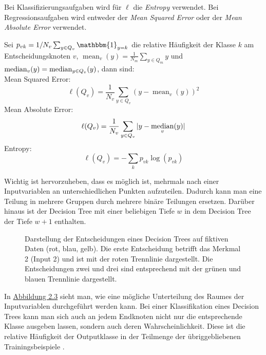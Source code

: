 Bei Klassifizierungsaufgaben wird f\"ur $\ell$ die \textit{Entropy} verwendet. Bei Regressionsaufgaben wird entweder der \textit{Mean Squared Error} oder
der \textit{Mean Absolute Error} verwendet.

Sei $p_{vk} = 1/N_v \sum_{y \in Q_v} \mathbbm{1}_{y = k}$
die relative H\"aufigkeit der Klasse $k$ am Entscheidungsknoten $v$, $\operatorname{mean}_v(y) = \frac{1}{N_m}\sum_{y\in Q_m}y$ und $ \operatorname*{median}_v(y) = \operatorname*{median}_{y \in Q_v}(y)$, dann sind: \\

Mean Squared Error:  $$ \ell(Q_v) = \frac{1}{N_v} \sum_{y\in Q_v} (y - \operatorname{mean}_v(y))^2 $$
Mean Absolute Error: $$ \ell(Q_v) = \frac{1}{N_v} \sum_{y\in Q_v} |y - \operatorname*{median}_v(y)| $$
Entropy: $$ \ell(Q_v) = - \sum_{k} p_{vk}\log(p_{vk}) $$

Wichtig ist hervorzuheben, dass es m\"oglich ist, mehrmals nach einer Inputvariablen an unterschiedlichen Punkten aufzuteilen.
Dadurch kann man eine Teilung in mehrere Gruppen durch mehrere bin\"are Teilungen ersetzen.
Dar\"uber hinaus ist der Decision Tree mit einer beliebigen Tiefe $w$ in dem Decision Tree der Tiefe $w + 1$ enthalten.

\begin{figure}[ht]
	\label{fig:rf2}
	\begin{center}
		\begin{tiny}
		\end{tiny}
	\end{center}
	\caption[Regression eines Random Forest Modells]
	{Darstellung der Entscheidungen eines Decision Trees auf fiktiven Daten (rot, blau, gelb). Die erste Entscheidung
		betrifft das Merkmal 2 (Input 2) und ist mit der roten Trennlinie dargestellt. Die Entscheidungen zwei und drei sind
		entsprechend mit der gr\"unen und blauen Trennlinie dargestellt.}
\end{figure}

In \hyperref[fig:rf2]{Abbildung 2.3} sieht man, wie eine m\"ogliche Unterteilung des
Raumes der Inputvariablen durchgef\"uhrt werden kann. Bei einer Klassifikation eines Decision Trees kann man sich auch an jedem Endknoten nicht nur die entsprechende Klasse
ausgeben lassen, sondern auch deren Wahrscheinlichkeit. Diese ist die relative H\"aufigkeit der Outputklasse in der Teilmenge der \"ubriggebliebenen Trainingsbeispiele \cite{sklearn}.






























